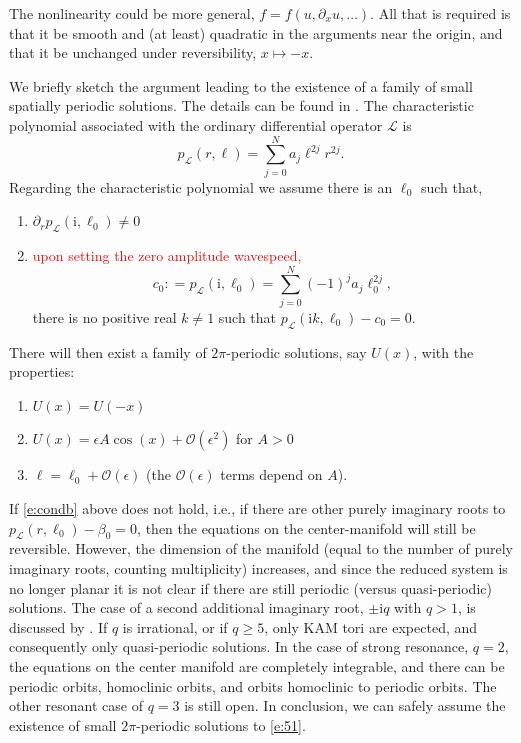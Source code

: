 \documentclass[review,onefignum,onetabnum]{siamart171218}
\def\coloneqq{\mathrel{\mathop:}=}
\newcommand{\rmi}{\mathrm{i}}
\newcommand{\calL}{\mathcal{L}}
\newcommand{\calO}{\mathcal{O}}
\newcommand{\revised}[1]{ \textcolor{red}{#1} }
\begin{document}
\begin{remark}
The nonlinearity could be more general, $f=f(u,\partial_xu,\dots)$. All that is required is that it be smooth and (at least) quadratic in the arguments near the origin, and that it be unchanged under reversibility, $x\mapsto-x$.
\end{remark}

We briefly sketch the argument leading to the existence of a family of small spatially periodic solutions. The details can be found in \cite[Theorem~3.15]{haragus:lbc11}.
The characteristic polynomial associated with the ordinary differential operator
$\calL$ is
\[
p_{\calL}(r,\ell)=\sum_{j=0}^Na_j\ell^{2j}r^{2j}.
\]
Regarding the characteristic polynomial we assume there is an $\ell_0$ such that,
\begin{enumerate}
\item $\partial_rp_{\calL}(\rmi,\ell_0)\neq0$
\item \revised{ upon setting the zero amplitude wavespeed, }
\begin{equation}\label{e:condb}
c_0\coloneqq p_{\calL}(\rmi,\ell_0)=\sum_{j=0}^N(-1)^ja_j\ell_0^{2j},
\end{equation}
there is no positive real $k\neq1$ such that $p_{\calL}(\rmi
    k,\ell_0)-c_0=0$.
\end{enumerate}
There will then exist a family of
$2\pi$-periodic solutions, say $U(x)$, with the properties:
\begin{enumerate}
\item $U(x)=U(-x)$
\item $U(x)=\epsilon A\cos(x)+\calO(\epsilon^2)$ for $A>0$
\item $\ell=\ell_0+\calO(\epsilon)$ (the $\calO(\epsilon)$ terms depend on
    $A$).
\end{enumerate}

If \cref{e:condb} above does not hold, i.e., if there are other purely
imaginary roots to $p_{\calL}(r,\ell_0)-\beta_0=0$, then the equations on the
center-manifold will still be reversible. However, the dimension of the
manifold (equal to the number of purely imaginary roots, counting
multiplicity) increases, and since the reduced system is no longer planar it
is not clear if there are still periodic (versus quasi-periodic) solutions.
The case of a second additional imaginary root, $\pm\rmi q$ with $q>1$, is
discussed by \cite[Chapter~4.3.4]{haragus:lbc11}. If $q$ is irrational, or
if $q\ge5$, only KAM tori are expected, and consequently only quasi-periodic
solutions. In the case of strong resonance, $q=2$, the equations on the
center manifold are completely integrable, and there can be periodic orbits,
homoclinic orbits, and orbits homoclinic to periodic orbits. The other
resonant case of $q=3$ is still open.
In conclusion, we can safely assume the existence of small $2\pi$-periodic
solutions to \cref{e:51}.
\end{document}
